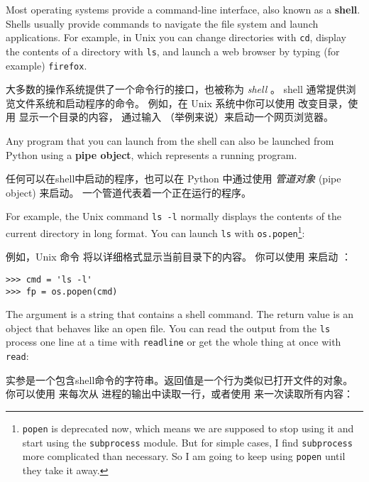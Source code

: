 {{{{{{{Most operating systems provide a command-line interface,
also known as a {\bf shell}.  Shells usually provide commands
to navigate the file system and launch applications.  For
example, in Unix you can change directories with {\tt cd},
display the contents of a directory with {\tt ls}, and launch
a web browser by typing (for example) {\tt firefox}.

大多数的操作系统提供了一个命令行的接口，也被称为 {\em shell} 。
shell 通常提供浏览文件系统和启动程序的命令。
例如，在 Unix 系统中你可以使用  改变目录，使用  显示一个目录的内容，
通过输入  （举例来说）来启动一个网页浏览器。

  

Any program that you can launch from the shell can also be
launched from Python using a {\bf pipe object}, which
represents a running program.

任何可以在shell中启动的程序，也可以在 Python 中通过使用 {\em 管道对象} (pipe object) 来启动。 一个管道代表着一个正在运行的程序。

For example, the Unix command {\tt ls -l} normally displays the
contents of the current directory in long format.  You can
launch {\tt ls} with {\tt os.popen}\footnote{{\tt popen} is deprecated
now, which means we are supposed to stop using it and start using
the {\tt subprocess} module.  But for simple cases, I find
{\tt subprocess} more complicated than necessary.  So I am going
to keep using {\tt popen} until they take it away.}:

例如，Unix 命令  将以详细格式显示当前目录下的内容。
你可以使用  来启动  ：

  

\begin{lstlisting}
>>> cmd = 'ls -l'
>>> fp = os.popen(cmd)
\end{lstlisting}
%
The argument is a string that contains a shell command.  The
return value is an object that behaves like an open
file.  You can read the output from the {\tt ls} process one
line at a time with {\tt readline} or get the whole thing at
once with {\tt read}:

实参是一个包含shell命令的字符串。返回值是一个行为类似已打开文件的对象。
你可以使用  来每次从  进程的输出中读取一行，或者使用  来一次读取所有内容：

  
  

}}}}}}}
